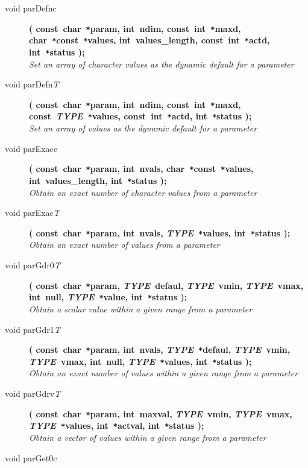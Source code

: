 \documentclass[twoside,11pt,nolof]{starlink}
\begin{document}
\begin{flushleft}
\begin{description}
\item[void parDefnc]
\textbf{( const~char~\texttt{*}param, int~ndim, const~int~\texttt{*}maxd,
               char~\texttt{*}const~\texttt{*}values, int~values\_length, const~int~\texttt{*}actd,
               int~\texttt{*}status );} \\
\textit{Set an array of character values as the dynamic default for a parameter}
\item[void parDefn\textit{T}]
\textbf{( const~char~\texttt{*}param, int~ndim, const~int~\texttt{*}maxd,
               const~\textit{TYPE}~\texttt{*}values, const~int~\texttt{*}actd,
               int~\texttt{*}status );} \\
\textit{Set an array of values as the dynamic default for a parameter}
\item[void parExacc]
\textbf{( const~char~\texttt{*}param, int~nvals, char~\texttt{*}const~\texttt{*}values,
               int~values\_length, int~\texttt{*}status );} \\
\textit{Obtain an exact number of character values from a parameter}
\item[void parExac\textit{T}]
\textbf{( const~char~\texttt{*}param, int~nvals, \textit{TYPE}~\texttt{*}values, int~\texttt{*}status );}\\
\textit{Obtain an exact number of values from a parameter}
\item[void parGdr0\textit{T}]
\textbf{( const~char~\texttt{*}param, \textit{TYPE}~defaul, \textit{TYPE}~vmin,
               \textit{TYPE}~vmax, int~null, \textit{TYPE}~\texttt{*}value,
               int~\texttt{*}status );} \\
\textit{Obtain a scalar value within a given range from a parameter}
\item[void parGdr1\textit{T}]
\textbf{( const~char~\texttt{*}param, int~nvals,
               \textit{TYPE}~\texttt{*}defaul, \textit{TYPE}~vmin,
               \textit{TYPE}~vmax, int~null, \textit{TYPE}~\texttt{*}values,
               int~\texttt{*}status );} \\
\textit{Obtain an exact number of values within a given range from a parameter}
\item[void parGdrv\textit{T}]
\textbf{( const~char~\texttt{*}param, int~maxval, \textit{TYPE}~vmin,
               \textit{TYPE}~vmax, \textit{TYPE}~\texttt{*}values,
               int~\texttt{*}actval, int~\texttt{*}status );} \\
\textit{Obtain a vector of values within a given range from a parameter}
\item[void parGet0c]

\end{description}
\end{flushleft}
\end{document}
